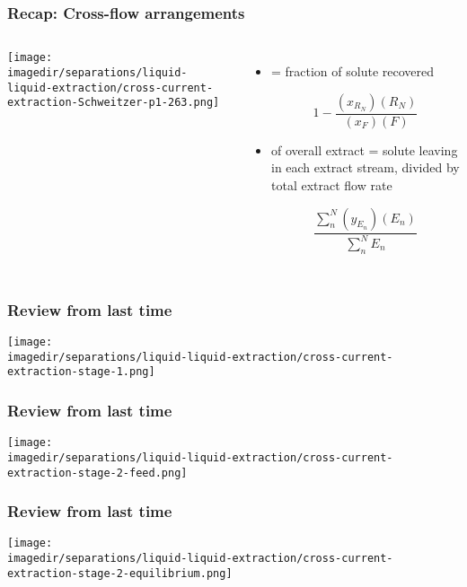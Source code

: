 \begin{frame}\frametitle{Recap: {\color{myOrange}Cross-flow arrangements}}
	\begin{columns}[t]
			\begin{center}
				\vspace{-12pt}
				{\color{myGreen}{$N=3$ in this illustration}}
				\texttt{[image: \\imagedir/separations/liquid-liquid-extraction/cross-current-extraction-Schweitzer-p1-263.png]}
			\end{center}
			\begin{itemize}
				\item	{\color{purple}{Recovery}} = fraction of solute recovered
					\begin{exampleblock}{}
						\[1 - \displaystyle\frac{(x_{R_N})(R_N)}{(x_F) (F)}\]
					\end{exampleblock}
				
				\vspace{6pt}
				\item	{\color{purple}{Concentration}} of overall extract = solute leaving in each extract stream, divided by total extract flow rate 
					\begin{exampleblock}{}
						\[\frac{\displaystyle \sum_n^N{(y_{E_n})(E_n)}}{ \displaystyle \sum_n^N{E_n}}\]
					\end{exampleblock}
			\end{itemize}
	\end{columns}	
\end{frame}

\begin{frame}\frametitle{Review from last time}
	\begin{center}
		\texttt{[image: \\imagedir/separations/liquid-liquid-extraction/cross-current-extraction-stage-1.png]}
	\end{center}
\end{frame}

\begin{frame}\frametitle{Review from last time}
	\begin{center}
		\texttt{[image: \\imagedir/separations/liquid-liquid-extraction/cross-current-extraction-stage-2-feed.png]}
	\end{center}
\end{frame}

\begin{frame}\frametitle{Review from last time}
	\begin{center}
		\texttt{[image: \\imagedir/separations/liquid-liquid-extraction/cross-current-extraction-stage-2-equilibrium.png]}
	\end{center}
\end{frame}

